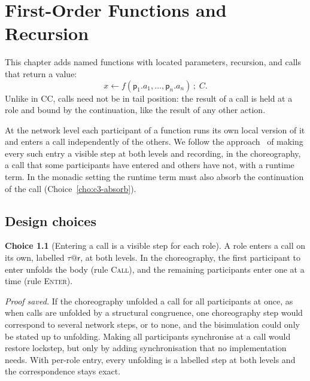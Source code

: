 \documentclass[11pt]{report}
\makeatletter
\theoremstyle{plain}
\theoremstyle{definition}
\newtheorem{choice}{Choice}[chapter]
\theoremstyle{remark}
\newcommand{\pp}{\mathsf{p}}
\newcommand{\rr}{\mathsf{r}}
\newcommand{\bind}[3]{#1 \leftarrow #2\,;\;#3}
\newcommand{\tauat}[1]{\tau\mathord{@}#1}
\newcommand{\rn}[1]{{\normalfont\scshape #1}}
\makeatother
\begin{document}
\chapter{First-Order Functions and Recursion}
\label{ch:fun}

This chapter adds named functions with located parameters, recursion, and
calls that return a value:
\[
  \bind{x}{f(\pp_1.a_1,\ldots,\pp_n.a_n)}{C}.
\]
Unlike in CC, calls need not be in tail position: the result of a call is
held at a role and bound by the continuation, like the result of any other
action.

At the network level each participant of a function runs its own local
version of it and enters a call independently of the others.  We follow the
approach~\cite{montesi-book,cmp-jar23,ozone24} of making every such entry a
visible step at both levels and
recording, in the choreography, a call that some participants have entered
and others have not, with a runtime term.  In the monadic setting the
runtime term must also absorb the continuation of the call
(Choice~\ref{cho:c3-absorb}).

\section{Design choices}
\label{sec:c3-choices}

\begin{choice}[Entering a call is a visible step for each role]\label{cho:c3-enter}
  A role enters a call on its own, labelled $\tauat{\rr}$, at both levels.  In
  the choreography, the first participant to enter unfolds the body (rule
  \rn{Call}), and the remaining participants enter one at a time (rule
  \rn{Enter}).

  \emph{Proof saved.}  If the choreography unfolded a call for all
  participants at once, as when calls are unfolded by a structural
  congruence, one choreography step would correspond to several network
  steps, or to none, and the bisimulation could only be stated up to
  unfolding.  Making all participants synchronise at a call would restore
  lockstep, but only by adding synchronisation that no implementation needs.
  With per-role entry, every unfolding is a labelled step at both levels and
  the correspondence stays exact.
\end{choice}
\end{document}
